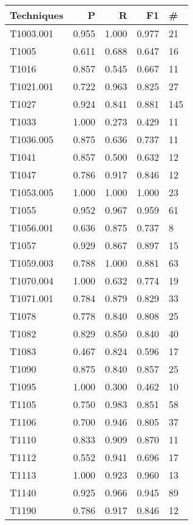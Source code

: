 \begin{tabular}{lrrrl}
    \toprule
    Techniques & P     & R     & F1    & \#  \\
    \midrule
    T1003.001  & 0.955 & 1.000 & 0.977 & 21  \\
    T1005      & 0.611 & 0.688 & 0.647 & 16  \\
    T1016      & 0.857 & 0.545 & 0.667 & 11  \\
    T1021.001  & 0.722 & 0.963 & 0.825 & 27  \\
    T1027      & 0.924 & 0.841 & 0.881 & 145 \\
    T1033      & 1.000 & 0.273 & 0.429 & 11  \\
    T1036.005  & 0.875 & 0.636 & 0.737 & 11  \\
    T1041      & 0.857 & 0.500 & 0.632 & 12  \\
    T1047      & 0.786 & 0.917 & 0.846 & 12  \\
    T1053.005  & 1.000 & 1.000 & 1.000 & 23  \\
    T1055      & 0.952 & 0.967 & 0.959 & 61  \\
    T1056.001  & 0.636 & 0.875 & 0.737 & 8   \\
    T1057      & 0.929 & 0.867 & 0.897 & 15  \\
    T1059.003  & 0.788 & 1.000 & 0.881 & 63  \\
    T1070.004  & 1.000 & 0.632 & 0.774 & 19  \\
    T1071.001  & 0.784 & 0.879 & 0.829 & 33  \\
    T1078      & 0.778 & 0.840 & 0.808 & 25  \\
    T1082      & 0.829 & 0.850 & 0.840 & 40  \\
    T1083      & 0.467 & 0.824 & 0.596 & 17  \\
    T1090      & 0.875 & 0.840 & 0.857 & 25  \\
    T1095      & 1.000 & 0.300 & 0.462 & 10  \\
    T1105      & 0.750 & 0.983 & 0.851 & 58  \\
    T1106      & 0.700 & 0.946 & 0.805 & 37  \\
    T1110      & 0.833 & 0.909 & 0.870 & 11  \\
    T1112      & 0.552 & 0.941 & 0.696 & 17  \\
    T1113      & 1.000 & 0.923 & 0.960 & 13  \\
    T1140      & 0.925 & 0.966 & 0.945 & 89  \\
    T1190      & 0.786 & 0.917 & 0.846 & 12  \\

\end{tabular}
